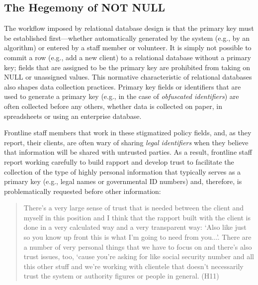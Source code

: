 \subsection{The Hegemony of NOT NULL}
The workflow imposed by relational database design is that the primary key must be established first---whether automatically generated by the system (e.g., by an algorithm) or entered by a staff member or volunteer. It is simply not possible to commit a row (e.g., add a new client) to a relational database without a primary key; fields that are assigned to be the primary key are prohibited from taking on NULL or unassigned values. This normative characteristic of relational databases also shapes data collection practices. Primary key fields or identifiers that are used to generate a primary key (e.g., in the case of \textit{obfuscated identifiers}) are often collected before any others, whether data is collected on paper, in spreadsheets or using an enterprise database.  

Frontline staff members that work in these stigmatized policy fields, and, as they report, their clients, are often wary of sharing \textit{legal identifiers} when they believe that information will be shared with untrusted parties. As a result, frontline staff report working carefully to build rapport and develop trust to facilitate the collection of the type of highly personal information that typically serves as a primary key (e.g., legal names or governmental ID numbers) and, therefore, is problematically requested before other information:

\begin{quote}\singlespacing There's a very large sense of trust that is needed between the client and myself in this position and I think that the rapport built with the client is done in a very calculated way and a very transparent way: `Also like just so you know up front this is what I'm going to need from you...'. There are a number of very personal things that we have to focus on and there's also trust issues, too, `cause you're asking for like social security number and all this other stuff and we're working with clientele that doesn't necessarily trust the system or authority figures or people in general. (H11)\end{quote}

